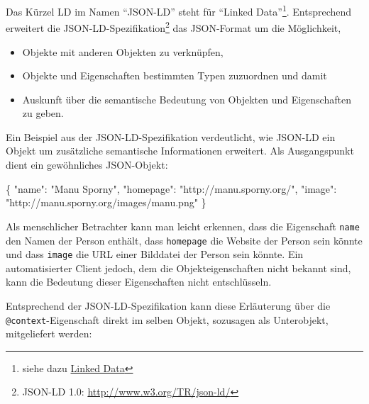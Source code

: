 \documentclass[,a4paper]{article}
\newenvironment{Shaded}{}{}
\newcommand{\DataTypeTok}[1]{\textcolor[rgb]{0.56,0.13,0.00}{{#1}}}
\newcommand{\StringTok}[1]{\textcolor[rgb]{0.25,0.44,0.63}{{#1}}}
\newcommand{\FunctionTok}[1]{\textcolor[rgb]{0.02,0.16,0.49}{{#1}}}
\begin{document}

Das Kürzel LD im Namen ``JSON-LD'' steht für ``Linked Data''\footnote{siehe
  dazu \hyperref[linkedux5fdata]{Linked Data}}. Entsprechend erweitert
die JSON-LD-Spezifikation\footnote{JSON-LD 1.0:
  \url{http://www.w3.org/TR/json-ld/}} das JSON-Format um die
Möglichkeit,

\begin{itemize}
\itemsep1pt\parskip0pt
\item
  Objekte mit anderen Objekten zu verknüpfen,
\item
  Objekte und Eigenschaften bestimmten Typen zuzuordnen und damit
\item
  Auskunft über die semantische Bedeutung von Objekten und Eigenschaften
  zu geben.
\end{itemize}

Ein Beispiel aus der JSON-LD-Spezifikation verdeutlicht, wie JSON-LD ein
Objekt um zusätzliche semantische Informationen erweitert. Als
Ausgangspunkt dient ein gewöhnliches JSON-Objekt:

\begin{Shaded}
\begin{Highlighting}[]
\FunctionTok{\{}
  \DataTypeTok{"name"}\FunctionTok{:} \StringTok{"Manu Sporny"}\FunctionTok{,}
  \DataTypeTok{"homepage"}\FunctionTok{:} \StringTok{"http://manu.sporny.org/"}\FunctionTok{,}
  \DataTypeTok{"image"}\FunctionTok{:} \StringTok{"http://manu.sporny.org/images/manu.png"}
\FunctionTok{\}}
\end{Highlighting}
\end{Shaded}

Als menschlicher Betrachter kann man leicht erkennen, dass die
Eigenschaft \texttt{name} den Namen der Person enthält, dass
\texttt{homepage} die Website der Person sein könnte und dass
\texttt{image} die URL einer Bilddatei der Person sein könnte. Ein
automatisierter Client jedoch, dem die Objekteigenschaften nicht bekannt
sind, kann die Bedeutung dieser Eigenschaften nicht entschlüsseln.

Entsprechend der JSON-LD-Spezifikation kann diese Erläuterung über die
\texttt{@context}-Eigenschaft direkt im selben Objekt, sozusagen als
Unterobjekt, mitgeliefert werden:
\end{document}
